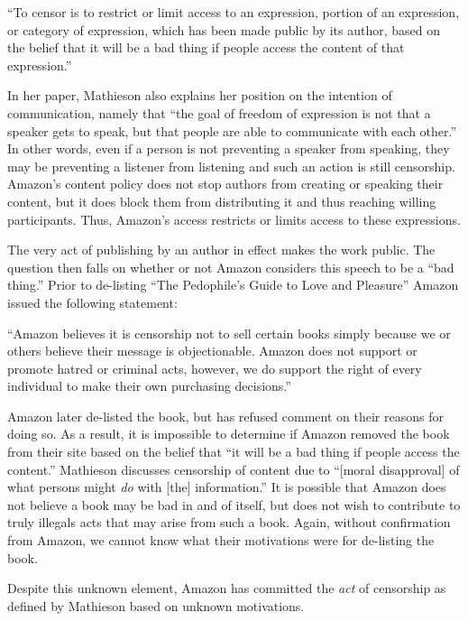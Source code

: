 \documentclass[11pt]{article}
\begin{document}
\begin{multicols}{2}
``To censor is to restrict or limit access to an expression, portion of an expression, or category of expression, which has been made public by its author, based on the belief that it will be a bad thing if people access the content of that expression.'' \cite{MathiesenCensorship}

In her paper, Mathieson also explains her position on the intention of communication, namely that ``the goal of freedom of expression is not that a speaker gets to speak, but that people are able to communicate with each other.''  In other words, even if a person is not preventing a speaker from speaking, they may be preventing a listener from listening and such an action is still censorship.  Amazon's content policy does not stop authors from creating or speaking their content, but it does block them from distributing it and thus reaching willing participants.  Thus, Amazon's access restricts or limits access to these expressions.

The very act of publishing by an author in effect makes the work public.  The question then falls on whether or not Amazon considers this speech to be a ``bad thing.''  Prior to de-listing ``The Pedophile's Guide to Love and Pleasure'' Amazon issued the following statement:

``Amazon believes it is censorship not to sell certain books simply because we or others believe their message is objectionable.  Amazon does not support or promote hatred or criminal acts, however, we do support the right of every individual to make their own purchasing decisions.'' \cite{TechCrunchAmazonCensorship}

Amazon later de-listed the book, but has refused comment on their reasons for doing so.  As a result, it is impossible to determine if Amazon removed the book from their site based on the belief that ``it will be a bad thing if people access the content.''  Mathieson discusses censorship of content due to ``[moral disapproval] of what persons might \emph{do} with [the] information.'' \cite{MathiesenCensorship}  It is possible that Amazon does not believe a book may be bad in and of itself, but does not wish to contribute to truly illegals acts that may arise from such a book.  Again, without confirmation from Amazon, we cannot know what their motivations were for de-listing the book.

Despite this unknown element, Amazon has committed the \emph{act} of censorship as defined by Mathieson based on unknown motivations.


\end{multicols}
\end{document}
